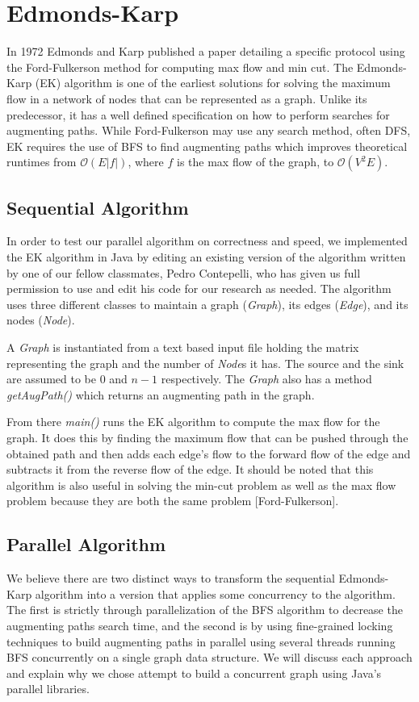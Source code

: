 \section{Edmonds-Karp}
In 1972 Edmonds and Karp published a paper detailing a specific protocol using the Ford-Fulkerson method for computing max flow and min cut. The Edmonds-Karp (EK) algorithm is one of the earliest solutions for solving the maximum flow in a network of nodes that can be represented as a graph. Unlike its predecessor, it has a well defined specification on how to perform searches for augmenting paths. While Ford-Fulkerson may use any search method, often DFS, EK requires the use of BFS to find augmenting paths which improves theoretical runtimes from $\mathcal{O}(E|f|)$, where $f$ is the max flow of the graph, to $\mathcal{O}(V^2E)$. 

\subsection{Sequential Algorithm}
In order to test our parallel algorithm on correctness and speed, we implemented the EK algorithm in Java by editing an existing version of the algorithm written by one of our fellow classmates, Pedro Contepelli, who has given us full permission to use and edit his code for our research as needed. The algorithm uses three different classes to maintain a graph (\textit{Graph}), its edges (\textit{Edge}), and its nodes (\textit{Node}).  
    
A \textit{Graph} is instantiated from a text based input file holding the matrix representing the graph and the number of \textit{Node}s it has. The source and the sink are assumed to be $0$ and $n-1$ respectively. The \textit{Graph} also has a method \textit{getAugPath()} which returns an augmenting path in the graph.

From there \textit{main()} runs the EK algorithm to compute the max flow for the graph. It does this by finding the maximum flow that can be pushed through the obtained path and then adds each edge's flow to the forward flow of the edge and subtracts it from the reverse flow of the edge. It should be noted that this algorithm is also useful in solving the min-cut problem as well as the max flow problem because they are both the same problem [Ford-Fulkerson].
    
\subsection{Parallel Algorithm}
We believe there are two distinct ways to transform the sequential Edmonds-Karp algorithm into a version that applies some concurrency to the algorithm. The first is strictly through parallelization of the BFS algorithm to decrease the augmenting paths search time, and the second is by using fine-grained locking techniques to build augmenting paths in parallel using several threads running BFS concurrently on a single graph data structure. We will discuss each approach and explain why we chose attempt to build a concurrent graph using Java's parallel libraries.
    
